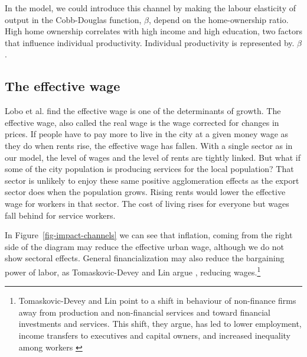 In the model, we could introduce this channel by making the labour elasticity of output in the Cobb-Douglas function, $\beta$, depend on the home-ownership ratio. High home ownership correlates with high income and high education, two factors that influence individual productivity. Individual productivity is represented by. $\beta$. %


\subsection{The effective wage}
 Lobo et al. \cite{loboUrbanScalingProduction2013} find the \gls{effective wage} is one of the determinants of growth. The effective wage, also called the real wage is the wage corrected for changes in prices. If people have to pay more to live in the city at a given money wage as they do when rents rise, the effective wage has fallen. With a single sector as in our model, the level of wages and the level of rents are tightly linked. But what if some of the city population is producing services for the local population? That sector is unlikely to enjoy these same positive agglomeration effects as the export sector does when the population grows. Rising rents would lower the effective wage for workers in that sector. The cost of living rises for everyone but wages fall behind for service workers.  %

In Figure~\ref{fig-impact-channels} we can see that inflation, coming from the right side of the diagram may reduce the effective urban wage, although we do not show sectoral effects. 
General financialization may also reduce the bargaining power of labor, as Tomaskovic-Devey and Lin argue \cite{tomaskovic-deveyFinancializationCausesInequality2013}, reducing wages.\footnote{Tomaskovic-Devey and Lin point to a shift in behaviour of non-finance firms away from production and non-financial services and toward financial investments and services. This shift, they argue, has led to lower employment, income transfers to executives and capital owners, and increased inequality among workers \cite{tomaskovic-deveyFinancializationCausesInequality2013}}





